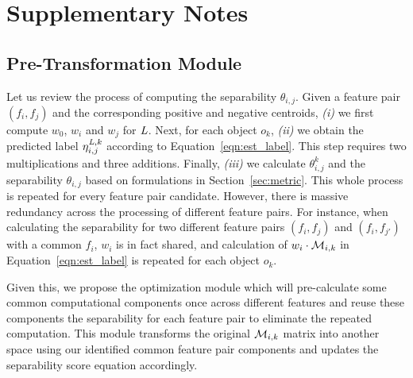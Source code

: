 \section{Supplementary Notes}

\subsection{Pre-Transformation Module} \label{app:trans}
Let us review the process of computing the separability $\theta_{i,j}$. Given a feature pair $(f_i,f_j)$ and the corresponding positive and negative centroids, {\em (i)} we first compute $w_0$, $w_i$ and $w_j$ for $\mathit{L}$. Next, for each object $o_k$, {\em (ii)} we obtain the predicted label $\eta_{i,j}^{\mathit{L},k}$ according to Equation~\ref{eqn:est_label}. This step requires two multiplications and three additions. Finally, {\em (iii)} we calculate $\theta_{i,j}^{k}$ and the separability $\theta_{i,j}$ based on formulations in Section~\ref{sec:metric}. This whole process is repeated for every feature pair candidate. However, there is massive redundancy across the processing of different feature pairs. For instance, when calculating the separability for two different feature pairs $(f_i,f_j)$ and $(f_i,f_{j'})$ with a common $f_i$, $w_i$ is in fact shared, and calculation of $w_i\cdot {\mathcal{M}}_{i,k}$ in Equation~\ref{eqn:est_label} is repeated for each object $o_k$.

Given this, we propose the \trans optimization module which will pre-calculate some common computational components once across different features and reuse these components the separability for each feature pair to eliminate the repeated computation. This \trans module transforms the original ${\mathcal{M}}_{i,k}$ matrix into another space using our identified common feature pair components and updates the separability score equation accordingly.

